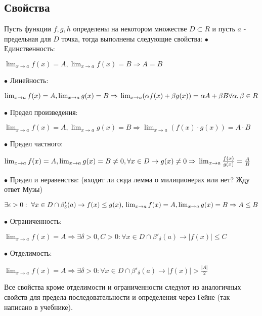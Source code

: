 \documentclass[12pt]{article}
\begin{document}
\subsection{Свойства}
Пусть функции $f, g, h$ определены на некотором множестве $D \subset R$ и пусть $a$ - предельная для $D$ точка, тогда выполнены следующие свойства:\newline
$\bullet$ Единственность:
\begin{center}
$\lim_{x \to a} f(x) = A, \lim_{x \to a} f(x) = B \Rightarrow A  = B$
\end{center}
$\bullet$ Линейность:
\begin{center}
$\lim_{x \to a} f(x) = A, \lim_{x \to a} g(x) = B \Rightarrow \\\lim_{x \to a} (\alpha f(x) + \beta g(x) ) = \alpha A + \beta B \ \\ \forall \alpha, \beta \in R$
\end{center}
$\bullet$ Предел произведения:
\begin{center}
$\lim_{x \to a} f(x) = A, \lim_{x \to a} g(x) = B \Rightarrow \lim_{x \to a} (f(x) \cdot g(x)) = A \cdot B$
\end{center}
$\bullet$ Предел частного:
\begin{center}
$\lim_{x \to a} f(x) = A, \lim_{x \to a} g(x) = B \not = 0, \forall x \in D \to g(x) \not = 0 \Rightarrow \\
\lim_{x \to a} \frac{f(x)}{g(x)} = \frac{A}{B}$
\end{center}
$\bullet$ Предел и неравенства: (входит ли сюда лемма о милиционерах или нет? Жду ответ Музы)
\begin{center}
$\exists \epsilon  > 0: \  \forall x \in D \cap \beta'_{\delta}(a) \to  f(x) \leq g(x), \\ \lim_{x \to a} f(x) = A, \lim_{x \to a} g(x) = B \Rightarrow \\A \leq B$
\end{center}
$\bullet$ Ограниченность:
\begin{center}
$\lim_{x \to a} f(x) = A \Rightarrow \exists \delta > 0, C > 0: \forall x \in D \cap \beta'_{\delta}(a)  \to |f(x)| \leq C $
\end{center}
$\bullet$ Отделимость:
\begin{center}
$\lim_{x \to a} f(x) = A \Rightarrow \exists \delta > 0: \forall x \in D \cap \beta'_{\delta}(a)  \to |f(x)| > \frac{|A|}{2}$
\end{center}
Все свойства кроме отделимости и ограниченности следуют из аналогичных свойств для предела последовательности и определения через Гейне (так написано в учебнике).\newline
\end{document}
